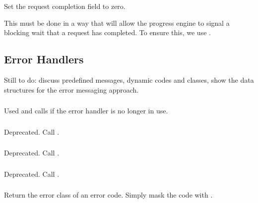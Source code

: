 \documentclass{article}
\begin{document}
\subsubsection{}
Set the request completion field  to zero.

This must be done in a way that will allow the progress engine to
signal a blocking wait that a request has completed.  To ensure this,
we use .  

\subsection{Error Handlers}
\label{sec:errhand}

Still to do:
discuss predefined messages, dynamic codes and classes, show the data
structures for the error messaging approach.
%

\subsubsection{}
Used  and calls
 if the error handler is no longer in use.

\subsubsection{}
Deprecated.  Call .

\subsubsection{}
Deprecated.  Call .

\subsubsection{}
Deprecated.  Call .

\subsubsection{}
Return the error class of an error code.  
Simply mask the code with .
\end{document}
